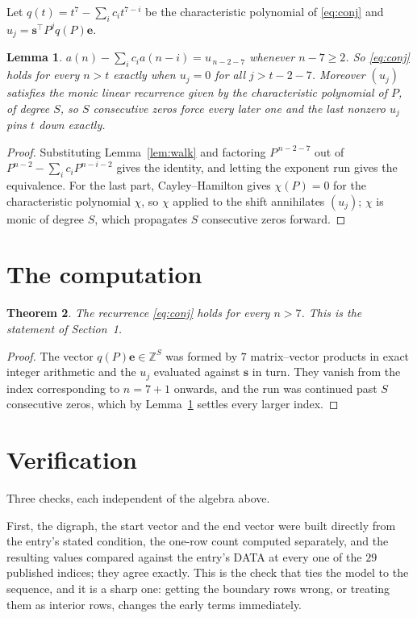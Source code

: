 \documentclass[11pt,a4paper]{article}
\theoremstyle{plain}
\newtheorem{theorem}{Theorem}
\newtheorem{lemma}[theorem]{Lemma}
\theoremstyle{definition}
\begin{document}
Let $q(t)=t^{7}-\sum_i c_i t^{7-i}$ be the characteristic polynomial of
\eqref{eq:conj} and $u_j=\mathbf{s}^{\!\top}P^{j}q(P)\mathbf{e}$.

\begin{lemma}\label{lem:crit}
$a(n)-\sum_i c_i a(n-i)=u_{\,n-2-7}$ whenever $n-7\ge2$. So \eqref{eq:conj}
holds for every $n>t$ exactly when $u_j=0$ for all $j>t-2-7$. Moreover $(u_j)$
satisfies the monic linear recurrence given by the characteristic polynomial of $P$, of
degree $S$, so $S$ consecutive zeros force every later one and the last nonzero $u_j$ pins
$t$ down exactly.
\end{lemma}

\begin{proof}
Substituting Lemma~\ref{lem:walk} and factoring $P^{\,n-2-7}$ out of
$P^{n-2}-\sum_i c_i P^{n-i-2}$ gives the identity, and letting the exponent run gives the
equivalence. For the last part, Cayley--Hamilton gives $\chi(P)=0$ for the characteristic
polynomial $\chi$, so $\chi$ applied to the shift annihilates $(u_j)$; $\chi$ is monic of
degree $S$, which propagates $S$ consecutive zeros forward.
\end{proof}

\section{The computation}

\begin{theorem}
The recurrence \eqref{eq:conj} holds for every $n>7$. This is the statement of
Section~1.
\end{theorem}

\begin{proof}
The vector $q(P)\mathbf{e}\in\mathbb{Z}^{S}$ was formed by $7$ matrix--vector
products in exact integer arithmetic and the $u_j$ evaluated against $\mathbf{s}$ in turn.
They vanish from the index corresponding to $n=7+1$ onwards, and the run was continued
past $S$ consecutive zeros, which by Lemma~\ref{lem:crit} settles every larger index.
\end{proof}

\section{Verification}

Three checks, each independent of the algebra above.

First, the digraph, the start vector and the end vector were built directly from the
entry's stated condition, the one-row count computed separately, and the resulting values
compared against the entry's DATA at every one of the $29$ published indices; they
agree exactly. This is the check that ties the model to the sequence, and it is a sharp one:
getting the boundary rows wrong, or treating them as interior rows, changes the early terms
immediately.
\end{document}
